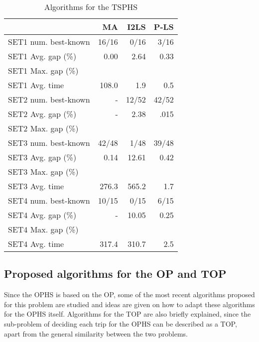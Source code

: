     \begin{center}
        \begin{table}[]
            \centering
            \begin{tabular}{|l|rrr|}
                \hline & MA & I2LS & P-LS  \\
                \hline SET1 num. best-known & 16/16 & 0/16 & 3/16 \\
                SET1 Avg. gap (\%) & 0.00 & 2.64 & 0.33 \\
                SET1 Max. gap (\%) &  &  &  \\
                SET1 Avg. time & 108.0 & 1.9 & 0.5 \\
                \hline SET2 num. best-known & - & 12/52 & 42/52 \\
                SET2 Avg. gap (\%) & - & 2.38 & .015 \\
                SET2 Max. gap (\%) &  &  &  \\
                \hline SET3 num. best-known & 42/48 & 1/48 & 39/48 \\
                SET3 Avg. gap (\%) & 0.14 & 12.61 & 0.42 \\
                SET3 Max. gap (\%) &  &  &  \\
                SET3 Avg. time & 276.3 & 565.2 & 1.7 \\
                \hline SET4 num. best-known & 10/15 & 0/15 & 6/15 \\
                SET4 Avg. gap (\%) & - & 10.05 & 0.25 \\
                SET4 Max. gap (\%) &  &  &  \\
                SET4 Avg. time & 317.4 & 310.7 & 2.5 \\
                \hline
            \end{tabular}  
            \caption{Algorithms for the TSPHS}
            \label{TSPHS comparison}
        \end{table}
    \end{center}

\subsection{Proposed algorithms for the OP and TOP}

    Since the OPHS is based on the OP, some of the most recent algorithms proposed for this problem are studied and ideas are given on how to adapt these algorithms for the OPHS itself. Algorithms for the TOP are also briefly explained, since the sub-problem of deciding each trip for the OPHS can be described as a TOP, apart from the general similarity between the two problems.
    

